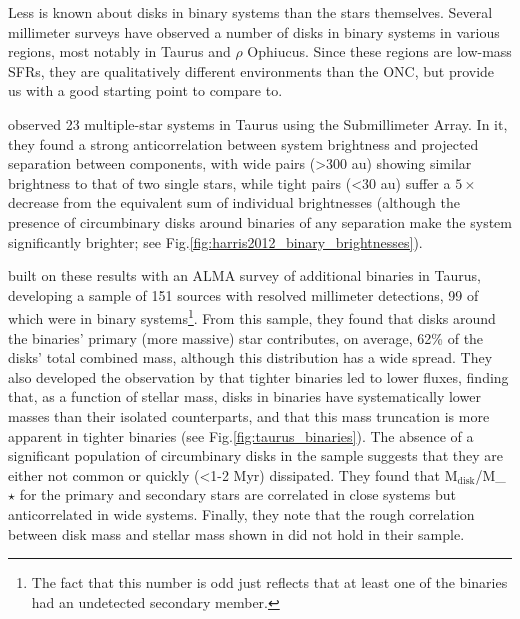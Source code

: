 
Less is known about disks in binary systems than the stars themselves. Several millimeter surveys have observed a number of disks in binary systems in various regions, most notably in Taurus and $\rho$ Ophiucus. Since these regions are low-mass SFRs, they are qualitatively different environments than the ONC, but provide us with a good starting point to compare to.


\citet{Harris2012} observed 23 multiple-star systems in Taurus using the Submillimeter Array. In it, they found a strong anticorrelation between system brightness and projected separation between components, with wide pairs (\textgreater300 au) showing similar brightness to that of two single stars, while tight pairs (\textless30 au) suffer a $5\times$ decrease from the equivalent sum of individual brightnesses (although the presence of circumbinary disks around binaries of any separation make the system significantly brighter; see Fig.\ref{fig:harris2012_binary_brightnesses}).

\citet{Akeson2019} built on these results with an ALMA survey of additional binaries in Taurus, developing a sample of 151 sources with resolved millimeter detections, 99 of which were in binary systems\footnote{The fact that this number is odd just reflects that at least one of the binaries had an undetected secondary member.}. From this sample, they found that disks around the binaries' primary (more massive) star contributes, on average, 62\% of the disks' total combined mass, although this distribution has a wide spread. They also developed the observation by \citet{Harris2012} \citep[and, previously, ][]{Jensen1995} that tighter binaries led to lower fluxes, finding that, as a function of stellar mass, disks in binaries have systematically lower masses than their isolated counterparts, and that this mass truncation is more apparent in tighter binaries (see Fig.\ref{fig:taurus_binaries}). The absence of a significant population of circumbinary disks in the sample suggests that they are either not common or quickly (\textless1-2 Myr) dissipated. They found that M$_\text{disk}$/M_$\star$ for the primary and secondary stars are correlated in close systems but anticorrelated in wide systems. Finally, they note that the rough correlation between disk mass and stellar mass shown in \citet{Andrews2013} did not hold in their sample.


